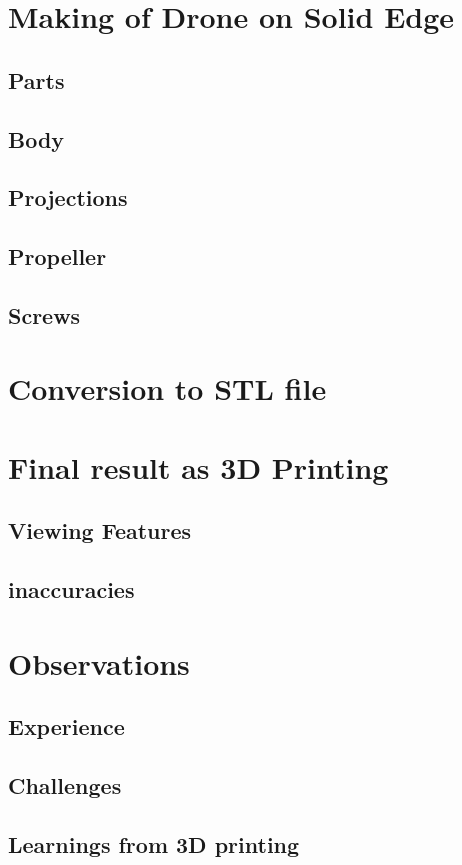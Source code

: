 \documentclass{article}
\begin{document}
\section{Making of Drone on Solid Edge}
\subsection{Parts}
\subsection{Body}
\subsection{Projections}
\subsection{Propeller}
\subsection{Screws}

\section{Conversion to STL file}

\section{Final result as 3D Printing}
\subsection{Viewing Features}
\subsection{inaccuracies}


\section{Observations}
\subsection{Experience}
\subsection{Challenges}
\subsection{Learnings from 3D printing}
\end{document}
